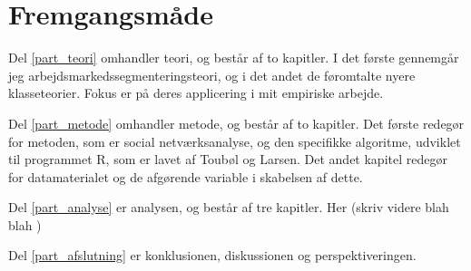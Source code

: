 \section{Fremgangsmåde}

Del \ref{part_teori} omhandler teori, og består af to kapitler. I det første gennemgår jeg arbejdsmarkedssegmenteringsteori, og i det andet de føromtalte nyere klasseteorier. Fokus er på deres applicering i mit empiriske arbejde.

Del \ref{part_metode} omhandler metode, og  består af to kapitler. Det første redegør for metoden, som er social netværksanalyse, og den specifikke algoritme, udviklet til programmet R, som er lavet af Toubøl og Larsen. Det andet kapitel redegør for datamaterialet og de afgørende variable i skabelsen af dette. 

Del \ref{part_analyse}  er analysen, og består af tre kapitler. Her (skriv videre blah blah )

Del \ref{part_afslutning} er konklusionen, diskussionen og perspektiveringen.






